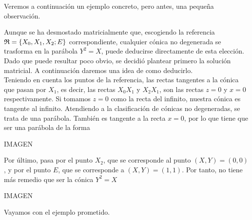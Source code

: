 Veremos a continuación un ejemplo concreto, pero antes, una pequeña observación.
\begin{obs}
	Aunque se ha desmostado matricialmente que, escogiendo la referencia $\mathfrak{R}=\{X_0,X_1,X_2;E\}$ correspondiente, cualquier cónica no degenerada se trasforma en la parábola $Y^2=X$, puede deducirse directamente de esta elección. Dado que puede resultar poco obvio, se decidió plantear primero la solución matricial. A continuación daremos una idea de como deducirlo.\\
	
	Teniendo en cuenta los puntos de la referencia, las rectas tangentes a la cónica que pasan por $X_1$, es decir, las rectas $X_0X_1$ y $X_2X_1$, son las rectas $z=0$ y $x=0$ respectivamente. Si tomamos $z=0$ como la recta del infinito, nuestra cónica es tangente al infinito. Atendiendo a la clasificación de cónicas no degeneradas, se trata de una parábola. También es tangente a la recta $x=0$, por lo que tiene que ser una parábola de la forma
	
	IMAGEN
	
	Por último, pasa por el punto $X_2$, que se corresponde al punto $(X,Y)=(0,0)$, y por el punto $E$, que se corresponde a $(X,Y)=(1,1)$. Por tanto, no tiene más remedio que ser la cónica $Y^2=X$
	
	IMAGEN
\end{obs}
Vayamos con el ejemplo prometido.
